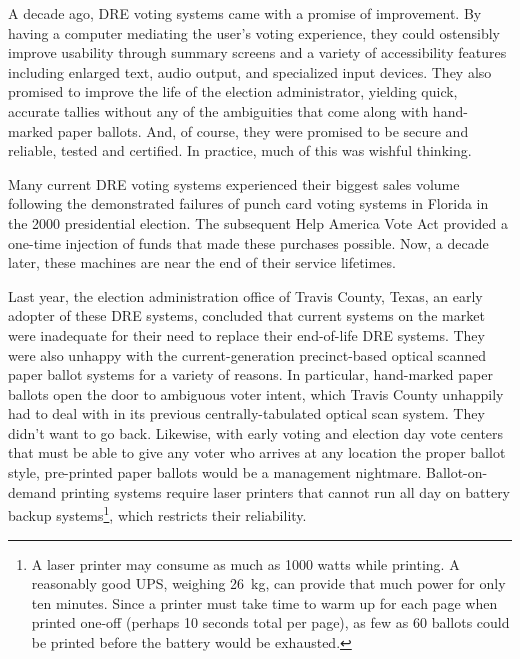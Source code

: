 \label{sec:intro}

A decade ago, DRE voting systems came with a promise of improvement. By having a
computer mediating the user's voting experience, they could ostensibly
improve usability through summary screens and a
variety of accessibility features including enlarged text, audio
output, and specialized input devices. They also promised to improve
the life of the election administrator, yielding quick, accurate tallies without
any of the ambiguities that come along with hand-marked paper ballots.
And, of course, they were promised to be secure and reliable, tested
and certified. In practice, much of this was wishful thinking.

Many current DRE voting systems experienced their biggest sales
volume following the demonstrated failures of punch card voting
systems in Florida in the 2000 presidential election. The subsequent Help America Vote Act
provided a one-time injection of funds that made these purchases
possible. Now, a decade later, these machines are near the end of
their service lifetimes. 

Last year, the election administration office of Travis County, Texas, an
early adopter of these DRE systems, concluded that current
systems on the market were inadequate for their need to replace their
end-of-life DRE systems. They were also unhappy with the
current-generation precinct-based optical scanned paper ballot systems
for a variety of reasons. In particular, hand-marked paper ballots
open the door to ambiguous voter intent, which Travis County unhappily
had to deal with in its previous centrally-tabulated optical scan
system. They didn't want to go back. Likewise, with early
voting and election day vote centers that must be able to give
any voter who arrives at
any location the proper ballot style, pre-printed paper ballots would
be a management nightmare.
Ballot-on-demand printing systems
require laser printers that cannot run all day on battery backup
systems\footnote{A laser printer may consume as much as 1000 watts
  while printing. A reasonably good UPS, weighing 26~kg, can provide
  that much power for only ten minutes. Since a printer must take time
  to warm up for each page when printed one-off (perhaps 10
  seconds total per page), as few as 60 ballots could be printed before the
  battery would be exhausted.},
which restricts their reliability.


